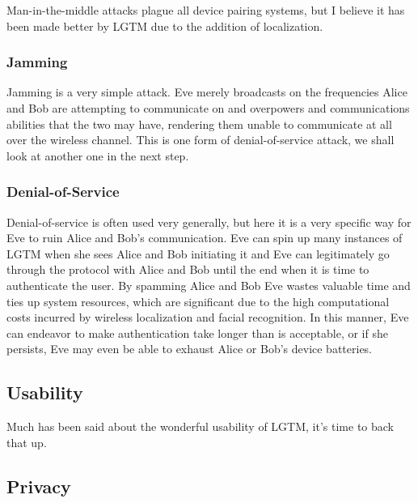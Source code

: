 \documentclass[12pt]{report}
\begin{document}
Man-in-the-middle attacks plague all device pairing systems, but I believe it has been made better by LGTM due to the addition of localization. \\

\subsubsection{Jamming}
Jamming is a very simple attack. Eve merely broadcasts on the frequencies Alice and Bob are attempting to communicate on and overpowers and communications abilities that the two may have, rendering them unable to communicate at all over the wireless channel. This is one form of denial-of-service attack, we shall look at another one in the next step.

\subsubsection{Denial-of-Service}
Denial-of-service is often used very generally, but here it is a very specific way for Eve to ruin Alice and Bob's communication. Eve can spin up many instances of LGTM when she sees Alice and Bob initiating it and Eve can legitimately go through the protocol with Alice and Bob until the end when it is time to authenticate the user. By spamming Alice and Bob Eve wastes valuable time and ties up system resources, which are significant due to the high computational costs incurred by wireless localization and facial recognition. In this manner, Eve can endeavor to make authentication take longer than is acceptable, or if she persists, Eve may even be able to exhaust Alice or Bob's device batteries.

\subsection{Usability}
Much has been said about the wonderful usability of LGTM, it's time to back that up.

\subsection{Privacy}
\end{document}
